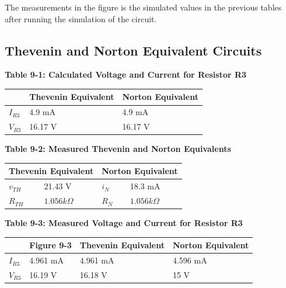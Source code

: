 \documentclass[a4paper]{article}
\begin{document}
The measurements in the figure is the simulated values in the previous tables after running the simulation of the circuit.
\pagebreak

\subsection{Thevenin and Norton Equivalent Circuits}


\begin{center}
    \small\textbf{Table 9-1: Calculated Voltage and Current for Resistor R3}
    \begin{tabular}{|p{3 cm}|p{3cm}|p{3 cm}|}
        \hline
         & Thevenin Equivalent & Norton Equivalent\\
        \hline
        $I_{R3}$ & 4.9 mA & 4.9 mA  \\
        \hline
        $V_{R3}$ & 16.17 V & 16.17 V  \\
        \hline
        
    \end{tabular}
\end{center}

\begin{center}
    \small\textbf{Table 9-2: Measured Thevenin and Norton Equivalents}
    \begin{tabular}{|p{3 cm}|p{3cm}|p{3 cm}|p{3 cm}|}      
        \hline
        \multicolumn{2}{|c|}{Thevenin Equivalent} & \multicolumn{2}{|c|}{Norton Equivalent}  \\
        \hline
        $v_{TH}$ & 21.43 V & $i_{N}$ & 18.3 mA \\
        \hline
        $R_{TH}$ & $1.056k\Omega$ & $R_{N}$ & $1.056k\Omega$ \\
        \hline
    \end{tabular}
\end{center}

\begin{center}
    \small\textbf{Table 9-3: Measured Voltage and Current for Resistor R3}
    \begin{tabular}{|p{3 cm}|p{3 cm}|p{3 cm}|p{3 cm}|}
        \hline
        & Figure 9-3 & Thevenin Equivalent & Norton Equivalent \\
        \hline
        $I_{R3}$ & 4.961 mA & 4.961 mA & 4.596 mA \\
        \hline
        $V_{R3}$ & 16.19 V & 16.18 V & 15 V\\
        \hline
    \end{tabular}
\end{center}
\pagebreak
\end{document}
